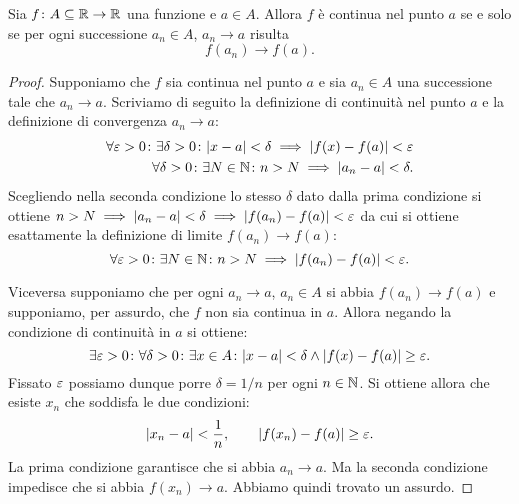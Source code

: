\begin{theorem}%
\label{th:cont_sequenziale}%
%
%
Sia $f\colon A \subseteq \mathbb R \to \mathbb R$ una funzione e $a\in A$.
Allora $f$ è continua nel punto $a$ se e solo se per ogni successione
$a_n\in A$, $a_n\to a$ risulta
\[
   f(a_n) \to f(a).
\]
\end{theorem}
%
\begin{proof}
Supponiamo che $f$ sia continua nel punto $a$ e sia $a_n\in A$
una successione tale che
$a_n \to a$. Scriviamo di seguito la definizione di continuità nel punto $a$
e la definizione di convergenza $a_n \to a$:
\begin{align*}
  \forall \varepsilon>0 \colon \exists \delta>0\colon
  {\left|x-a\right|}< \delta \implies {\left|f(x)-f(a)\right|}< \varepsilon \\
  \forall \delta>0 \colon \exists N\in \mathbb N \colon
  n>N \implies {\left|a_n-a\right|} < \delta.
\end{align*}
Scegliendo nella seconda condizione lo stesso $\delta$ dato dalla prima
condizione si ottiene $n>N \implies {\left|a_n-a\right|}< \delta \implies {\left|f(a_n)-f(a)\right|}
<\varepsilon$ da cui si ottiene esattamente la definizione di limite $f(a_n)\to f(a)$:
\[
  \forall \varepsilon>0\colon \exists N\in \mathbb N\colon
  n>N\implies {\left|f(a_n)-f(a)\right|} < \varepsilon.
\]

Viceversa supponiamo che per ogni $a_n\to a$, $a_n\in A$
si abbia $f(a_n)\to f(a)$ e supponiamo,
per assurdo, che $f$ non sia continua in $a$. Allora negando la
condizione di continuità in $a$ si ottiene:
\[
  \exists \varepsilon>0 \colon \forall \delta>0 \colon \exists x\in A\colon
  {\left|x-a\right|}<\delta \land {\left|f(x)-f(a)\right|}\ge \varepsilon.
\]
Fissato $\varepsilon$ possiamo dunque porre $\delta = 1/n$ per ogni $n\in \mathbb N$.
Si ottiene allora che esiste $x_n$ che soddisfa le due condizioni:
\[
  {\left|x_n-a\right|}<\frac 1 n, \qquad {\left|f(x_n)-f(a)\right|}\ge \varepsilon.
\]
La prima condizione garantisce che si abbia $a_n \to a$.
Ma la seconda condizione impedisce che si abbia $f(x_n)\to a$.
Abbiamo quindi trovato un assurdo.
\end{proof}

